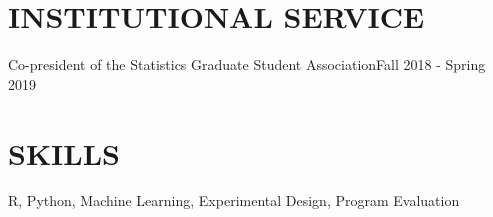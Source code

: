 \documentclass{res}
\begin{document}
\begin{resume}

\section{INSTITUTIONAL SERVICE}
Co-president of the Statistics Graduate Student Association\hfill Fall 2018 - Spring 2019
\section{SKILLS}
R, Python, Machine Learning, Experimental Design, Program Evaluation  %


\end{resume}
\end{document}
